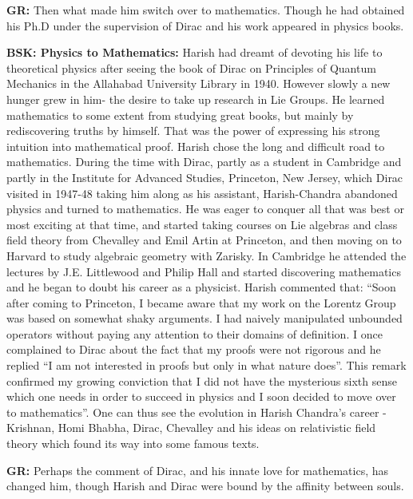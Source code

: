 \textbf{GR:} Then what made him switch over to mathematics. Though he had obtained his Ph.D under the supervision of Dirac and his work appeared in physics books.

\textbf{BSK: Physics to Mathematics:}  Harish had dreamt of devoting his life to theoretical physics after seeing the book of Dirac on Principles of Quantum Mechanics in the Allahabad University Library in 1940. However slowly a new hunger grew in him- the desire to take up research in Lie Groups. He learned mathematics to some extent from studying great books, but mainly by rediscovering truths by himself. That was the power of expressing his strong intuition into mathematical proof. Harish chose the long and difficult road to mathematics. During the time with Dirac, partly as a student in Cambridge and partly in the Institute for Advanced Studies, Princeton, New Jersey, which Dirac visited in 1947-48 taking him along as his assistant, Harish-Chandra abandoned physics and turned to mathematics. He was eager to conquer all that was best or most exciting at that time, and started taking courses on Lie algebras and class field theory from Chevalley and Emil Artin at Princeton, and then moving on to Harvard to study algebraic geometry with Zarisky. In Cambridge he attended the lectures by J.E. Littlewood and Philip Hall and started discovering mathematics and he began to doubt his career as a physicist. Harish commented that: “Soon after coming to Princeton, I became aware that my work on the Lorentz Group was based on somewhat shaky arguments.  I had naively manipulated unbounded operators without paying any attention to their domains of definition. I once complained to Dirac about the fact that my proofs were not rigorous and he replied “I am not interested in proofs but only in what nature does”.  This remark confirmed my growing conviction that I did not have the mysterious sixth sense which one needs in order to succeed in physics and I soon decided to move over to mathematics”. One can thus see the evolution in Harish Chandra’s career - Krishnan, Homi Bhabha, Dirac, Chevalley and his ideas on relativistic field theory which found its way into some famous texts.

\textbf{GR:} Perhaps the comment of Dirac, and his innate love for mathematics, has changed him, though Harish and Dirac were bound by the affinity between souls.

